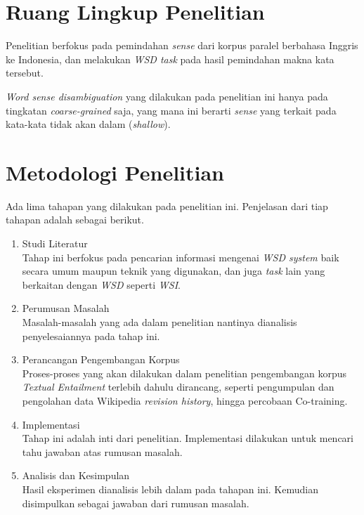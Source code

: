 \section{Ruang Lingkup Penelitian}
Penelitian berfokus pada pemindahan \textit{sense} dari korpus paralel berbahasa Inggris ke Indonesia, dan melakukan \textit{WSD task} pada hasil pemindahan makna kata tersebut.

\textit{Word sense disambiguation} yang dilakukan pada penelitian ini hanya pada tingkatan \textit{coarse-grained} saja, yang mana ini berarti \textit{sense} yang terkait pada kata-kata tidak akan dalam (\textit{shallow}).

\section{Metodologi Penelitian}
Ada lima tahapan yang dilakukan pada penelitian ini. Penjelasan dari tiap tahapan adalah sebagai berikut.
\begin{enumerate}
	\item Studi Literatur \\
	Tahap ini berfokus pada pencarian informasi mengenai \textit{WSD system} baik secara umum maupun teknik yang digunakan, dan juga \textit{task} lain yang berkaitan dengan \textit{WSD} seperti \textit{WSI}.
	\item Perumusan Masalah \\
	Masalah-masalah yang ada dalam penelitian nantinya dianalisis penyelesaiannya pada tahap ini.
	\item Perancangan Pengembangan Korpus\\
	Proses-proses yang akan dilakukan dalam penelitian pengembangan korpus \textit{Textual Entailment} terlebih dahulu dirancang, seperti pengumpulan dan pengolahan data Wikipedia \textit{revision history}, hingga percobaan Co-training.
	\item Implementasi  \\
	Tahap ini adalah inti dari penelitian. Implementasi dilakukan untuk mencari tahu jawaban atas rumusan masalah. 
	\item Analisis dan Kesimpulan \\
	Hasil eksperimen dianalisis lebih dalam pada tahapan ini. Kemudian disimpulkan sebagai jawaban dari rumusan masalah.
\end{enumerate}


